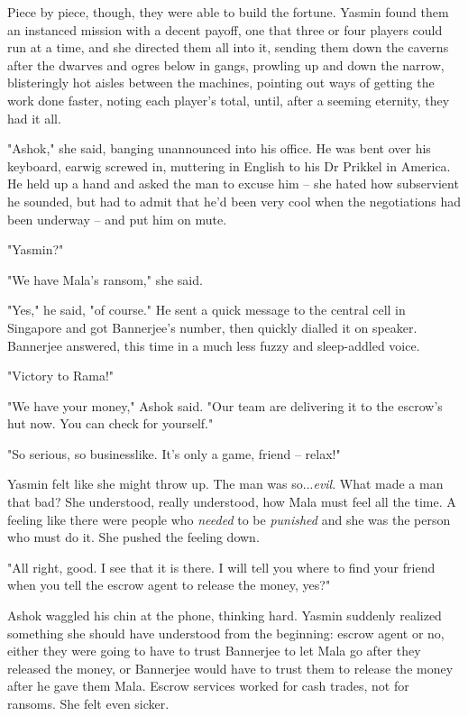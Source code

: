 Piece by piece, though, they were able to build the fortune. Yasmin
found them an instanced mission with a decent payoff, one that
three or four players could run at a time, and she directed them
all into it, sending them down the caverns after the dwarves and
ogres below in gangs, prowling up and down the narrow, blisteringly
hot aisles between the machines, pointing out ways of getting the
work done faster, noting each player's total, until, after a
seeming eternity, they had it all.

"Ashok," she said, banging unannounced into his office. He was bent
over his keyboard, earwig screwed in, muttering in English to his
Dr Prikkel in America. He held up a hand and asked the man to
excuse him -- she hated how subservient he sounded, but had to
admit that he'd been very cool when the negotiations had been
underway -- and put him on mute.

"Yasmin?"

"We have Mala's ransom," she said.

"Yes," he said, "of course." He sent a quick message to the central
cell in Singapore and got Bannerjee's number, then quickly dialled
it on speaker. Bannerjee answered, this time in a much less fuzzy
and sleep-addled voice.

"Victory to Rama!"

"We have your money," Ashok said. "Our team are delivering it to
the escrow's hut now. You can check for yourself."

"So serious, so businesslike. It's only a game, friend -- relax!"

Yasmin felt like she might throw up. The man was so...\emph{evil}.
What made a man that bad? She understood, really understood, how
Mala must feel all the time. A feeling like there were people who
\emph{needed} to be \emph{punished} and she was the person who must
do it. She pushed the feeling down.

"All right, good. I see that it is there. I will tell you where to
find your friend when you tell the escrow agent to release the
money, yes?"

Ashok waggled his chin at the phone, thinking hard. Yasmin suddenly
realized something she should have understood from the beginning:
escrow agent or no, either they were going to have to trust
Bannerjee to let Mala go after they released the money, or
Bannerjee would have to trust them to release the money after he
gave them Mala. Escrow services worked for cash trades, not for
ransoms. She felt even sicker.

